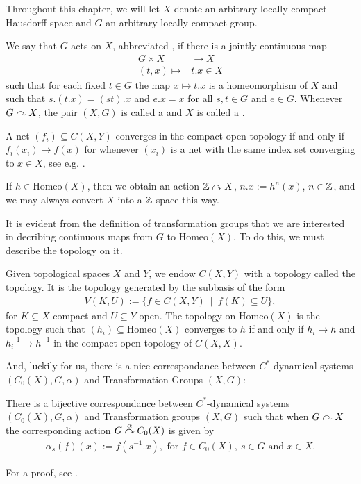Throughout this chapter, we will let $X$ denote an arbitrary locally compact Hausdorff space and $G$ an arbitrary locally compact group. 
\begin{definition}
	We say that $G$ acts on $X$, abbreviated , if there is a jointly continuous map
	\begin{align*}
		G \times X &\to X\\
		(t,x) \mapsto &t.x \in X
	\end{align*}
	such that for each fixed $t \in G$ the map $x \mapsto t.x$ is a homeomorphism of $X$ and such that $s.(t.x) = (st).x$ and $e.x = x$ for all $s,t \in G$ and $e \in G$. Whenever $G \stackrel{}{\curvearrowright} X$, the pair $(X,G)$ is called a  and $X$ is called a .
\end{definition}
\begin{remark}
	A net $(f_i) \subseteq C(X,Y)$ converges in the compact-open topology if and only if $f_i(x_i) \to f(x)$ for whenever $(x_i)$ is a net with the same index set converging to $x \in X$, see e.g. \cite[Lemma 1.30]{williamscrossed}.
\end{remark}
\begin{example}
	If $h \in \mathrm{Homeo}(X)$, then we obtain an action $\mathbb{Z}  \stackrel{}{\curvearrowright} X$, $n.x := h^n(x)$, $n \in \mathbb{Z}$, and we may always convert $X$ into a $\mathbb{Z}$-space this way.
\end{example}
It is evident from the definition of transformation groups that we are interested in decribing continuous maps from $G$ to $\mathrm{Homeo}(X)$. To do this, we must describe the topology on it.
\begin{definition}
	Given topological spaces $X$ and $Y$, we endow $C(X,Y)$ with a topology called the  topology. It is the topology generated by the subbasis of the form
	\begin{align*}
		V(K,U) := \{ f \in C(X,Y) \ \mid \ f(K) \subseteq U\},
	\end{align*}
	for $K \subseteq X$ compact and $U \subseteq Y$ open. The topology on $\mathrm{Homeo}(X)$ is the topology such that $(h_i) \subseteq \mathrm{Homeo}(X)$ converges to $h$ if and only if $h_i \to h$ and $h_i^{-1} \to h^{-1}$ in the compact-open topology of $C(X,X)$.
\end{definition}
And, luckily for us, there is a nice correspondance between $C^*$-dynamical systems $(C_0(X),G,\alpha)$ and Transformation Groups $(X,G)$:
\begin{proposition}
	There is a bijective correspondance between $C^*$-dynamical systems $(C_0(X),G,\alpha)$ and Transformation groups $(X,G)$ such that when $G \stackrel{}{\curvearrowright} X$ the corresponding action $G \stackrel{\alpha}{\curvearrowright} C_0(X)$ is given by
	\begin{align*}
		\alpha_s(f)(x):= f(s^{-1}.x), \text{ for } f \in C_0(X), \ s \in G \text{ and } x \in X.
	\end{align*}
	\label{dynamiccorr}
\end{proposition}
For a proof, see \cite[Lemma 1.33, 2.5 and Proposition 2.6]{williamscrossed}.

